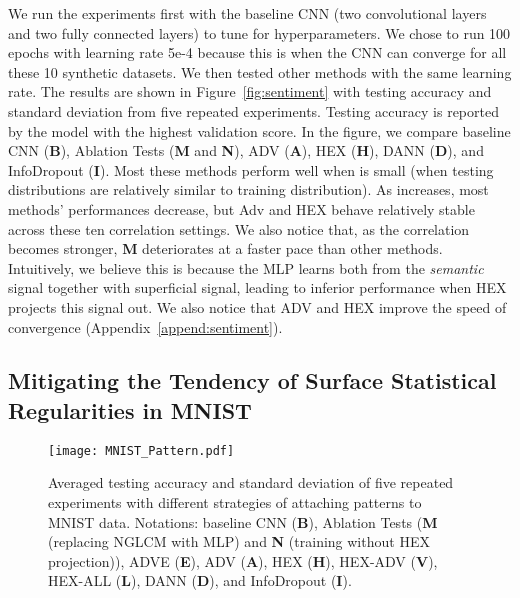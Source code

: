 We run the experiments first with the baseline CNN 
(two convolutional layers and two fully connected layers) 
to tune for hyperparameters. 
We chose to run 100 epochs with learning rate 5e-4 
because this is when the CNN can converge for all these 10 synthetic datasets. 
We then tested other methods with the same learning rate. 
The results are shown in Figure~\ref{fig:sentiment} 
with testing accuracy and standard deviation 
from five repeated experiments. 
Testing accuracy is reported by the model 
with the highest validation score. 
In the figure, we compare baseline CNN (\textbf{B}), Ablation Tests (\textbf{M} and \textbf{N}), ADV (\textbf{A}), HEX (\textbf{H}), DANN (\textbf{D}), and InfoDropout (\textbf{I}). 
Most these methods perform well when  is small 
(when testing distributions are relatively similar to training distribution). 
As  increases, most methods' performances decrease, 
but Adv and HEX behave relatively stable across these ten correlation settings. We also notice that, as the correlation becomes stronger, 
\textbf{M} deteriorates at a faster pace than other methods. 
Intuitively, we believe this is because the MLP learns both from the  
\emph{semantic} signal together with superficial signal, 
leading to inferior performance when HEX projects this signal out. 
We also notice that ADV and HEX improve the speed of convergence (Appendix~\ref{append:sentiment}). 

\subsection{Mitigating the Tendency of Surface Statistical Regularities in MNIST}


\begin{figure}
    \centering
    \texttt{[image: MNIST\_Pattern.pdf]}
    \caption{Averaged testing accuracy and standard deviation of five repeated experiments with different strategies of attaching patterns to MNIST data. Notations: baseline CNN (\textbf{B}), Ablation Tests (\textbf{M} (replacing NGLCM with MLP) and \textbf{N} (training without HEX projection)), ADVE (\textbf{E}), ADV (\textbf{A}), HEX (\textbf{H}), HEX-ADV (\textbf{V}), HEX-ALL (\textbf{L}), DANN (\textbf{D}), and InfoDropout (\textbf{I}).}
    \label{fig:MNIST_P}
\end{figure}

